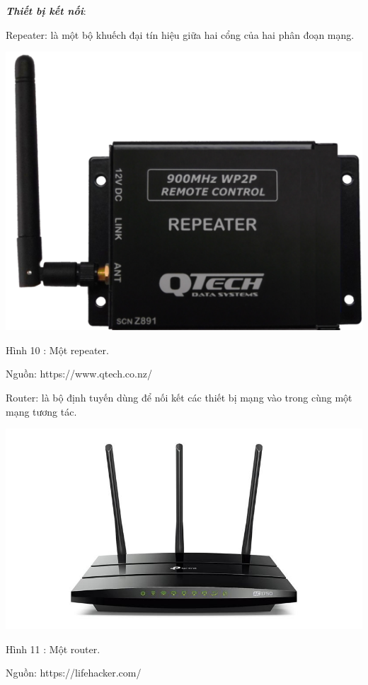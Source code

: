 \documentclass{report}
\begin{document}
\bigskip
\setlength{\parindent}{0.2cm}
\textbf{\textit{Thiết bị kết nối}}:

\smallskip
Repeater: là một bộ khuếch đại tín hiệu giữa hai cổng của hai phân đoạn mạng.

\begin{center}
     \includegraphics[scale=0.3]{repeater}
\end{center}
\centerline{Hình 10 : Một repeater.}
\changefontsizes{12pt}
\centerline{Nguồn: https://www.qtech.co.nz/}
\changefontsizes{13pt}

\bigskip
Router: là bộ định tuyến dùng để nối kết các thiết bị mạng vào trong cùng một mạng tương tác.


\begin{center}
     \includegraphics[scale=0.3]{router}
\end{center}
\centerline{Hình 11 : Một router.}
\changefontsizes{12pt}
\centerline{Nguồn: https://lifehacker.com/}
\changefontsizes{13pt}
\bigskip
\end{document}
